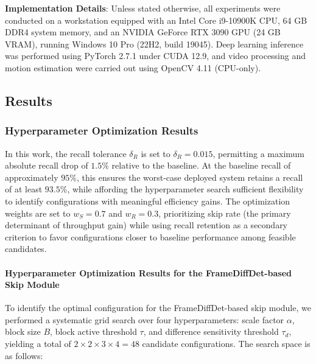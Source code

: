 \documentclass[
  10pt,
]{article}
\begin{document}
\textbf{Implementation Details}: Unless stated otherwise, all
experiments were conducted on a workstation equipped with an Intel Core
i9-10900K CPU, 64 GB DDR4 system memory, and an NVIDIA GeForce RTX 3090
GPU (24 GB VRAM), running Windows 10 Pro (22H2, build 19045). Deep
learning inference was performed using PyTorch 2.7.1 under CUDA 12.9,
and video processing and motion estimation were carried out using OpenCV
4.11 (CPU-only).

\subsection{Results}\label{results}

\subsubsection{Hyperparameter Optimization
Results}\label{hyperparameter-optimization-results}

In this work, the recall tolerance \(\delta_R\) is set to
\(\delta_R = 0.015\), permitting a maximum absolute recall drop of
\(1.5\%\) relative to the baseline. At the baseline recall of
approximately \(95\%\), this ensures the worst-case deployed system
retains a recall of at least \(93.5\%\), while affording the
hyperparameter search sufficient flexibility to identify configurations
with meaningful efficiency gains. The optimization weights are set to
\(w_S = 0.7\) and \(w_R =
0.3\), prioritizing skip rate (the primary determinant of throughput
gain) while using recall retention as a secondary criterion to favor
configurations closer to baseline performance among feasible candidates.

\paragraph{Hyperparameter Optimization Results for the
FrameDiffDet-based Skip Module}\label{sec:frameDiffResults}

To identify the optimal configuration for the FrameDiffDet-based skip
module, we performed a systematic grid search over four hyperparameters:
scale factor \(\alpha\), block size \(B\), block active threshold
\(\tau\), and difference sensitivity threshold \(\tau_d\), yielding a
total of \(2 \times 2 \times 3 \times 4 = 48\) candidate configurations.
The search space is as follows:
\end{document}
